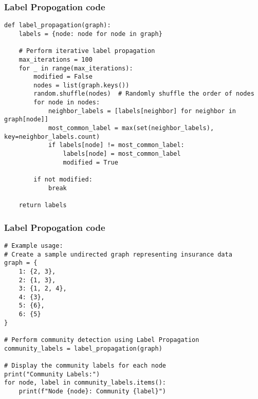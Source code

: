\begin{frame}[fragile]\frametitle{Label Propogation code}
{\tiny
\begin{lstlisting}
def label_propagation(graph):
    labels = {node: node for node in graph}

    # Perform iterative label propagation
    max_iterations = 100
    for _ in range(max_iterations):
        modified = False
        nodes = list(graph.keys())
        random.shuffle(nodes)  # Randomly shuffle the order of nodes
        for node in nodes:
            neighbor_labels = [labels[neighbor] for neighbor in graph[node]]
            most_common_label = max(set(neighbor_labels), key=neighbor_labels.count)
            if labels[node] != most_common_label:
                labels[node] = most_common_label
                modified = True

        if not modified:
            break

    return labels
\end{lstlisting}
}
\end{frame}



\begin{frame}[fragile]\frametitle{Label Propogation code}
{\tiny
\begin{lstlisting}
# Example usage:
# Create a sample undirected graph representing insurance data
graph = {
    1: {2, 3},
    2: {1, 3},
    3: {1, 2, 4},
    4: {3},
    5: {6},
    6: {5}
}

# Perform community detection using Label Propagation
community_labels = label_propagation(graph)

# Display the community labels for each node
print("Community Labels:")
for node, label in community_labels.items():
    print(f"Node {node}: Community {label}")

\end{lstlisting}
}
\end{frame}

